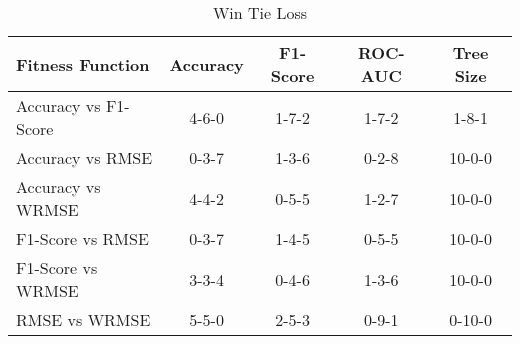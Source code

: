 
    \begin{table}[H]
        \centering
        \renewcommand{\arraystretch}{1.2}
        \caption{Win Tie Loss}
        \label{tab:RQ_Fitness_wtl}
    \begin{tabular}{lcccc}
\toprule
Fitness Function & Accuracy & F1-Score & ROC-AUC & Tree Size \\
\midrule
Accuracy vs F1-Score & 4-6-0 & 1-7-2 & 1-7-2 & 1-8-1 \\
Accuracy vs RMSE & 0-3-7 & 1-3-6 & 0-2-8 & 10-0-0 \\
Accuracy vs WRMSE & 4-4-2 & 0-5-5 & 1-2-7 & 10-0-0 \\
F1-Score vs RMSE & 0-3-7 & 1-4-5 & 0-5-5 & 10-0-0 \\
F1-Score vs WRMSE & 3-3-4 & 0-4-6 & 1-3-6 & 10-0-0 \\
RMSE vs WRMSE & 5-5-0 & 2-5-3 & 0-9-1 & 0-10-0 \\
\bottomrule
\end{tabular}

        
    \end{table}
    